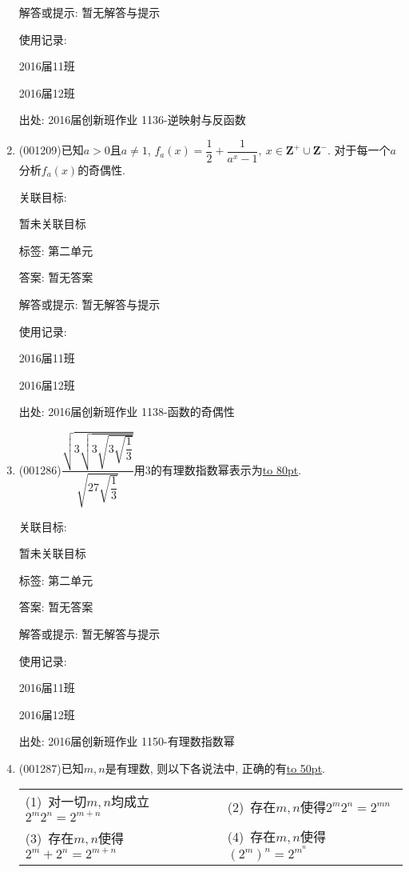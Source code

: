 \documentclass[10pt,a4paper]{article}
\newcommand{\blank}[1]{\underline{\hbox to #1pt{}}}
\newcommand{\vartwoch}[4]{\par\begin{tabular}{p{.46\textwidth}p{.46\textwidth}}
(1)~#1& (2)~#2\\
(3)~#3& (4)~#4
\end{tabular}}
\begin{document}
\begin{enumerate}[1.]
解答或提示: 暂无解答与提示

使用记录:

2016届11班							

2016届12班							


出处: 2016届创新班作业	1136-逆映射与反函数
\item { (001209)}已知$a>0$且$a\ne 1$, $f_a(x)=\dfrac{1}{2}+\dfrac{1}{a^x-1},\ x \in \mathbf{Z}^+\cup \mathbf{Z}^-$. 对于每一个$a$分析$f_a(x)$的奇偶性.


关联目标:

暂未关联目标



标签: 第二单元

答案: 暂无答案

解答或提示: 暂无解答与提示

使用记录:

2016届11班	

2016届12班	


出处: 2016届创新班作业	1138-函数的奇偶性
\item { (001286)}$\dfrac{\sqrt{3\sqrt{3\sqrt{3\sqrt{\dfrac{1}{3}}}}}}{\sqrt{27\sqrt{\dfrac{1}{3}}}}$用$3$的有理数指数幂表示为\blank{80}.


关联目标:

暂未关联目标



标签: 第二单元

答案: 暂无答案

解答或提示: 暂无解答与提示

使用记录:

2016届11班	

2016届12班	


出处: 2016届创新班作业	1150-有理数指数幂
\item { (001287)}已知$m,n$是有理数, 则以下各说法中, 正确的有\blank{50}.
\vartwoch{对一切$m,n$均成立$2^m2^n=2^{m+n}$}{存在$m,n$使得$2^m2^n=2^{mn}$}{存在$m,n$使得$2^m+2^n=2^{m+n}$}{存在$m,n$使得$(2^m)^n=2^{m^n}$}



\end{enumerate}
\end{document}

